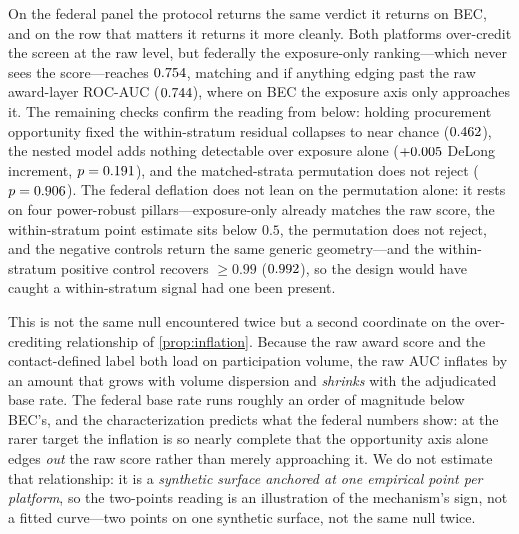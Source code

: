 \label{sec:comparative_interpretation}
On the federal panel the protocol returns the same verdict it returns
on BEC, and on the row that matters it returns it more cleanly. Both
platforms over-credit the screen at the raw level, but federally the
exposure-only ranking---which never sees the score---reaches
$0.754$, matching and if anything edging past the raw
award-layer ROC-AUC ($0.744$), where on BEC the exposure
axis only approaches it. The remaining checks confirm the reading from
below: holding procurement opportunity fixed the within-stratum
residual collapses to near chance ($0.462$), the nested
model adds nothing detectable over exposure alone
($+0.005$ DeLong increment, $p=0.191$),
and the matched-strata permutation does not reject
($p=0.906$). The federal deflation does not lean on the
permutation alone: it rests on four power-robust pillars---exposure-only
already matches the raw score, the within-stratum point estimate sits
below $0.5$, the permutation does not reject, and the negative controls
return the same generic geometry---and the within-stratum positive
control recovers $\geq 0.99$ ($0.992$), so the
design would have caught a within-stratum signal had one been present.

This is not the same null encountered twice but a second coordinate on
the over-crediting relationship of \ref{prop:inflation}. Because the
raw award score and the contact-defined label both load on
participation volume, the raw AUC inflates by an amount that grows with
volume dispersion and \emph{shrinks} with the adjudicated base rate.
The federal base rate runs roughly an order of magnitude below BEC's,
and the characterization predicts what the federal numbers show: at the
rarer target the inflation is so nearly complete that the opportunity
axis alone edges \emph{out} the raw score rather than merely
approaching it. We do not estimate that relationship: it is a
\emph{synthetic surface anchored at one empirical point per platform},
so the two-points reading is an illustration of the mechanism's sign,
not a fitted curve---two points on one synthetic surface, not the same
null twice.


